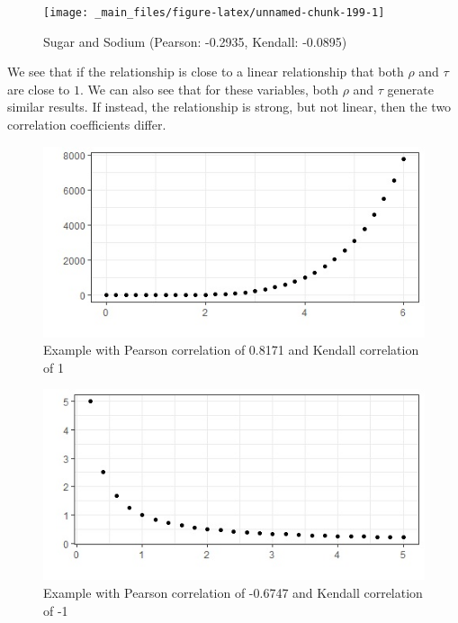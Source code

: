 \documentclass[
]{book}
\theoremstyle{definition}
\theoremstyle{definition}
\theoremstyle{definition}
\theoremstyle{definition}
\theoremstyle{remark}
\begin{document}
\begin{figure}

{\centering \texttt{[image: \_main\_files/figure-latex/unnamed-chunk-199-1]} 

}

\caption{Sugar and Sodium (Pearson: -0.2935, Kendall: -0.0895)}\label{fig:unnamed-chunk-199}
\end{figure}

We see that if the relationship is close to a linear relationship that both \(\rho\) and \(\tau\) are close to \(1\). We can also see that for these variables, both \(\rho\) and \(\tau\) generate similar results. If instead, the relationship is strong, but not linear, then the two correlation coefficients differ.

\begin{figure}

{\centering \includegraphics[width=0.8\linewidth]{images/correl_example1} 

}

\caption{Example with Pearson correlation of 0.8171 and Kendall correlation of 1}\label{fig:unnamed-chunk-200}
\end{figure}

\begin{figure}

{\centering \includegraphics[width=0.8\linewidth]{images/correl_example2} 

}

\caption{Example with Pearson correlation of -0.6747 and Kendall correlation of -1}\label{fig:unnamed-chunk-201}
\end{figure}
\end{document}
